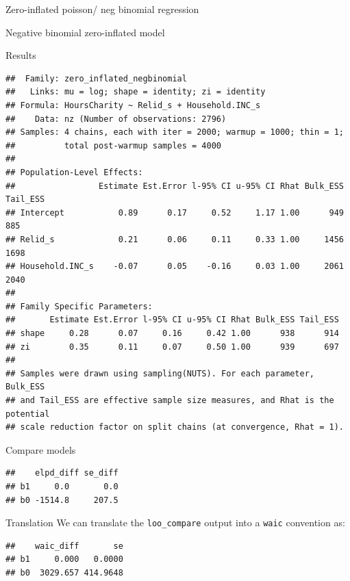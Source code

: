 \documentclass[
  ignorenonframetext,
]{beamer}
\begin{document}
\begin{frame}[fragile]{Zero-inflated poisson/ neg binomial regression}
\begin{block}{Negative binomial zero-inflated model}
\protect\hypertarget{negative-binomial-zero-inflated-model}{}
\end{block}

\begin{block}{Results}
\protect\hypertarget{results-4}{}
\begin{verbatim}
##  Family: zero_inflated_negbinomial 
##   Links: mu = log; shape = identity; zi = identity 
## Formula: HoursCharity ~ Relid_s + Household.INC_s 
##    Data: nz (Number of observations: 2796) 
## Samples: 4 chains, each with iter = 2000; warmup = 1000; thin = 1;
##          total post-warmup samples = 4000
## 
## Population-Level Effects: 
##                 Estimate Est.Error l-95% CI u-95% CI Rhat Bulk_ESS Tail_ESS
## Intercept           0.89      0.17     0.52     1.17 1.00      949      885
## Relid_s             0.21      0.06     0.11     0.33 1.00     1456     1698
## Household.INC_s    -0.07      0.05    -0.16     0.03 1.00     2061     2040
## 
## Family Specific Parameters: 
##       Estimate Est.Error l-95% CI u-95% CI Rhat Bulk_ESS Tail_ESS
## shape     0.28      0.07     0.16     0.42 1.00      938      914
## zi        0.35      0.11     0.07     0.50 1.00      939      697
## 
## Samples were drawn using sampling(NUTS). For each parameter, Bulk_ESS
## and Tail_ESS are effective sample size measures, and Rhat is the potential
## scale reduction factor on split chains (at convergence, Rhat = 1).
\end{verbatim}
\end{block}

\begin{block}{Compare models}
\protect\hypertarget{compare-models}{}
\begin{verbatim}
##    elpd_diff se_diff
## b1     0.0       0.0
## b0 -1514.8     207.5
\end{verbatim}
\end{block}

\begin{block}{Translation}
\protect\hypertarget{translation}{}
We can translate the \texttt{loo\_compare} output into a \texttt{waic}
convention as:

\begin{verbatim}
##    waic_diff       se
## b1     0.000   0.0000
## b0  3029.657 414.9648
\end{verbatim}
\end{block}


\end{frame}
\end{document}
